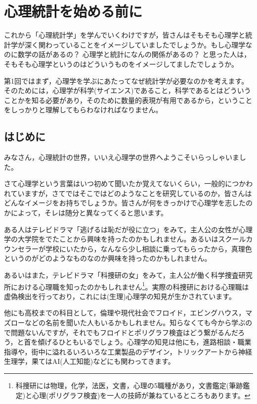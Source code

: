 \documentclass{ltjsbook}
\begin{document}
 
\chapter{心理統計を始める前に} 
\label{chapter1} 
これから「心理統計学」を学んでいくわけですが，皆さんはそもそも心理学と統計学が深く関わっていることをイメージしていましたでしょうか。もし心理学なのに数学の話があるの？ 心理学と統計になんの関係があるの？ と思った人は，そもそも心理学というのはどういうものをイメージしてましたでしょうか。

第1回ではまず，心理学を学ぶにあたってなぜ統計学が必要なのかを考えます。そのためには，心理学が科学(サイエンス)であること，科学であるとはどういうことかを知る必要があり，そのために数量的表現が有用であるから，ということをしっかりと理解してもらわなければなりません。

\section{はじめに} 

みなさん，心理統計の世界，いいえ心理学の世界へようこそいらっしゃいました。

さて心理学という言葉はいつ初めて聞いたか覚えてないくらい，一般的につかわれていますが，さてではそこではどのようなことを研究しているのか，皆さんはどんなイメージをお持ちでしょうか。皆さんが何をきっかけで心理学を志したのかによって，そレは随分と異なってくると思います。

ある人はテレビドラマ「逃げるは恥だが役に立つ」をみて，主人公の女性が心理学の大学院をでたことから興味を持ったのかもしれません。あるいはスクールカウンセラーが学校にいたから，なんなら少し相談に乗ってもらったから，真理色というのがどのようなものなのか興味を持ったのかもしれません。

あるいはまた，テレビドラマ「科捜研の女」をみて，主人公が働く科学捜査研究所における心理職を知ったのかもしれません\footnote{科捜研には物理，化学，法医，文書，心理の5職種があり，文書鑑定(筆跡鑑定)と心理(ポリグラフ検査)を一人の技師が兼ねているところもあります。}。実際の科捜研における心理職は虚偽検出を行っており，これには(生理)心理学の知見が生かされています。

他にも高校までの科目として，倫理や現代社会でフロイド，エビングハウス，マズローなどの名前を聞いた人もいるかもしれません。知らなくても今から学ぶので問題ないんですが，それでもフロイドとポリグラフ検査はどう繋がるんだろう，と首を傾げるひともいるでしょう。心理学の知見は他にも，進路相談・職業指導や，街中に溢れるいろいろな工業製品のデザイン，トリックアートから神経生理学，果てはAI(人工知能)などにも関わってきます。
\end{document}
